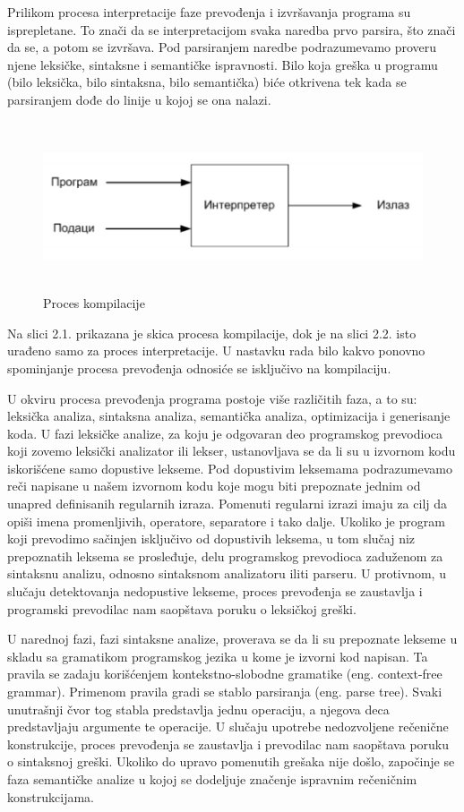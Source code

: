 \documentclass[12pt,oneside]{memoir}
\begin{document}
Prilikom procesa interpretacije faze prevođenja i izvršavanja programa su 
isprepletane. To znači da se interpretacijom svaka naredba prvo parsira, što znači da se, a potom se izvršava. Pod parsiranjem naredbe podrazumevamo proveru njene leksičke, sintaksne i semantičke ispravnosti. Bilo koja greška u programu (bilo leksička, bilo sintaksna, bilo semantička) biće otkrivena tek kada se parsiranjem dođe do linije u kojoj se ona nalazi. 

\begin{figure}
\includegraphics[width=\textwidth, height=5cm]{interpretacija}
\caption{Proces kompilacije}
\centering
\end{figure}

Na slici 2.1. prikazana je skica procesa kompilacije, dok je na slici 2.2. isto urađeno samo za proces interpretacije. U nastavku rada bilo kakvo ponovno spominjanje procesa prevođenja odnosiće se isključivo na kompilaciju.

U okviru procesa prevođenja programa postoje više različitih faza, a to su: leksička 
analiza, sintaksna analiza, semantička analiza, optimizacija i generisanje koda.
U fazi leksičke analize, za koju je odgovaran deo programskog prevodioca koji 
zovemo leksički analizator ili lekser, ustanovljava se da li su u izvornom kodu 
iskorišćene samo dopustive lekseme. Pod dopustivim leksemama podrazumevamo reči napisane u našem izvornom kodu koje mogu biti prepoznate jednim od unapred definisanih regularnih izraza. Pomenuti regularni izrazi imaju za cilj da opiši imena promenljivih, operatore, separatore i tako dalje. Ukoliko je program koji prevodimo sačinjen isključivo od dopustivih leksema, u tom slučaj niz prepoznatih 
leksema se prosleđuje, delu programskog prevodioca zaduženom za sintaksnu 
analizu, odnosno sintaksnom analizatoru iliti parseru. U protivnom, u slučaju 
detektovanja nedopustive lekseme, proces prevođenja se zaustavlja i programski 
prevodilac nam saopštava poruku o leksičkoj greški. 

U narednoj fazi, fazi sintaksne analize, proverava se da li su prepoznate lekseme u skladu sa 
gramatikom programskog jezika u kome je izvorni kod napisan. 
Ta pravila se zadaju korišćenjem kontekstno-slobodne gramatike
(eng. context-free grammar). Primenom pravila gradi se stablo parsiranja (eng. parse
tree). Svaki unutrašnji čvor tog stabla predstavlja jednu operaciju, a njegova deca
predstavljaju argumente te operacije. U slučaju upotrebe nedozvoljene rečenične konstrukcije, proces prevođenja se zaustavlja i prevodilac nam saopštava poruku o sintaksnoj greški. Ukoliko do upravo pomenutih grešaka nije došlo, započinje se faza semantičke analize u kojoj se 
dodeljuje značenje ispravnim rečeničnim konstrukcijama. 
\end{document}
